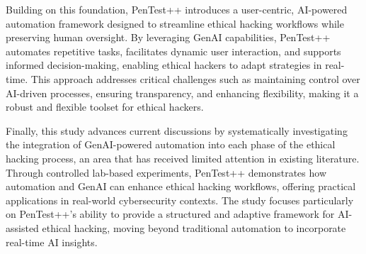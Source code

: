 Building on this foundation, PenTest++ introduces a user-centric, AI-powered automation framework designed to streamline ethical hacking workflows while preserving human oversight. By leveraging GenAI capabilities, PenTest++ automates repetitive tasks, facilitates dynamic user interaction, and supports informed decision-making, enabling ethical hackers to adapt strategies in real-time. This approach addresses critical challenges such as maintaining control over AI-driven processes, ensuring transparency, and enhancing flexibility, making it a robust and flexible toolset for ethical hackers. 

Finally, this study advances current discussions by systematically investigating the integration of GenAI-powered automation  into each phase of the ethical hacking process, an area that has received limited attention in existing literature. Through controlled lab-based experiments, PenTest++ demonstrates how automation and GenAI can enhance ethical hacking workflows, offering practical applications in real-world cybersecurity contexts. The study focuses particularly on PenTest++'s ability to provide a structured and adaptive framework for AI-assisted ethical hacking, moving beyond traditional automation to incorporate real-time AI insights.